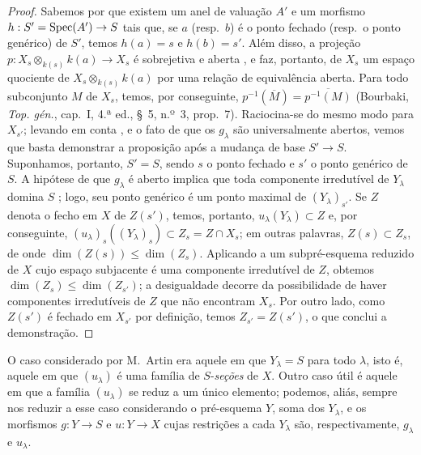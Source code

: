\begin{proof}
Sabemos por  que existem um anel de valuação $A'$ e um morfismo $h:S'=\Spec(A')\to S$ tais que, se $a$ (resp.\ $b$) é o ponto fechado (resp.\ o ponto genérico) de $S'$, temos $h(a)=s$ e $h(b)=s'$.
Além disso, a projeção $p:X_s\otimes_{k(s)}k(a)\to X_s$ é sobrejetiva e aberta , e faz, portanto, de $X_s$ um espaço quociente de $X_s\otimes_{k(s)}k(a)$ por uma relação de equivalência aberta.
Para todo subconjunto $M$ de $X_s$, temos, por conseguinte, $p^{-1}(\overline{M})=\overline{p^{-1}(M)}$ (Bourbaki, \emph{Top. gén.}, cap.~I, 4.ª ed., \S~5, n.º~3, prop.~7).
Raciocina-se do mesmo modo para $X_{s'}$; levando em conta ,  e o fato de que os $g_\lambda$ são universalmente abertos, vemos que basta demonstrar a proposição após a mudança de base $S'\to S$.
Suponhamos, portanto, $S'=S$, sendo $s$ o ponto fechado e $s'$ o ponto genérico de $S$.
A hipótese de que $g_\lambda$ é aberto implica que toda componente irredutível de $Y_\lambda$ domina $S$ ; logo, seu ponto genérico é um ponto maximal de $(Y_\lambda)_{s'}$.
Se $Z$ denota o fecho em $X$ de $Z(s')$, temos, portanto, $u_\lambda(Y_\lambda)\subset Z$ e, por conseguinte, $(u_\lambda)_s((Y_\lambda)_s)\subset Z_s=Z\cap X_s$; em outras palavras, $Z(s)\subset Z_s$, de onde $\dim(Z(s))\leq\dim(Z_s)$.
Aplicando  a um subpré-esquema reduzido de $X$ cujo espaço subjacente é uma componente irredutível de $Z$, obtemos $\dim(Z_s)\leq\dim(Z_{s'})$; a desigualdade decorre da possibilidade de haver componentes irredutíveis de $Z$ que não encontram $X_s$.
Por outro lado, como $Z(s')$ é fechado em $X_{s'}$ por definição, temos $Z_{s'}=Z(s')$, o que conclui a demonstração.
\end{proof}

\begin{remark}[14.3.12]
\label{IV.14.3.12}
O caso considerado por M.~Artin era aquele em que $Y_\lambda=S$ para todo $\lambda$, isto é, aquele em que $(u_\lambda)$ é uma família de $S$-\emph{seções} de $X$.
Outro caso útil é aquele em que a família $(u_\lambda)$ se reduz a um único elemento; podemos, aliás, sempre nos reduzir a esse caso considerando o pré-esquema $Y$, soma dos $Y_\lambda$, e os morfismos $g:Y\to S$ e $u:Y\to X$ cujas restrições a cada $Y_\lambda$ são, respectivamente, $g_\lambda$ e $u_\lambda$.
\end{remark}

